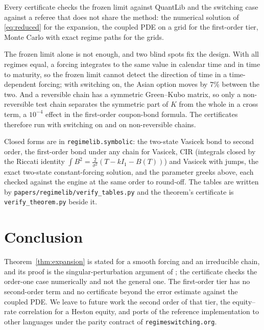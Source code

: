 \documentclass[11pt]{article}
\theoremstyle{remark}
\newcommand{\ql}{\textsf{QuantLib}}
\begin{document}
Every certificate checks the frozen limit against \ql{} and the switching case against a referee that does not
share the method: the numerical solution of \eqref{eq:reduced} for the expansion, the coupled PDE on a grid for
the first-order tier, Monte Carlo with exact regime paths for the grids.

The frozen limit alone is not enough, and two blind spots fix the design. With all regimes equal, a forcing integrates to the same value in calendar
time and in time to maturity, so the frozen limit cannot detect the direction of time in a time-dependent
forcing; with switching on, the Asian option moves by 7\% between the two. And a reversible chain has a symmetric
Green--Kubo matrix, so only a non-reversible test chain separates the symmetric part of $K$ from the whole in a
cross term, a $10^{-4}$ effect in the first-order coupon-bond formula. The certificates therefore run with
switching on and on non-reversible chains.

Closed forms are in \texttt{regimelib.symbolic}: the two-state Vasicek bond to second order, the first-order
bond under any chain for Vasicek, CIR (integrals closed by the Riccati identity $\int B^2 = \frac2{\sigma^2}(T - kI_1 - B(T))$)
and Vasicek with jumps, the exact two-state constant-forcing solution, and the parameter greeks above, each
checked against the engine at the same order to round-off. The tables are written by
\texttt{papers/regimelib/verify\_tables.py} and the theorem's certificate is \texttt{verify\_theorem.py} beside it.

\section{Conclusion}

Theorem~\ref{thm:expansion} is stated for a smooth forcing and an irreducible chain, and its proof is the
singular-perturbation argument of \citet{yin2013}; the certificate checks the order-one case
numerically and not the general one. The first-order tier has no second-order term and no certificate beyond the
error estimate against the coupled PDE. We leave to future work the second order of that tier, the equity--rate
correlation for a Heston equity, and ports of the reference implementation to other languages under the parity
contract of \texttt{regimeswitching.org}.



\end{document}
